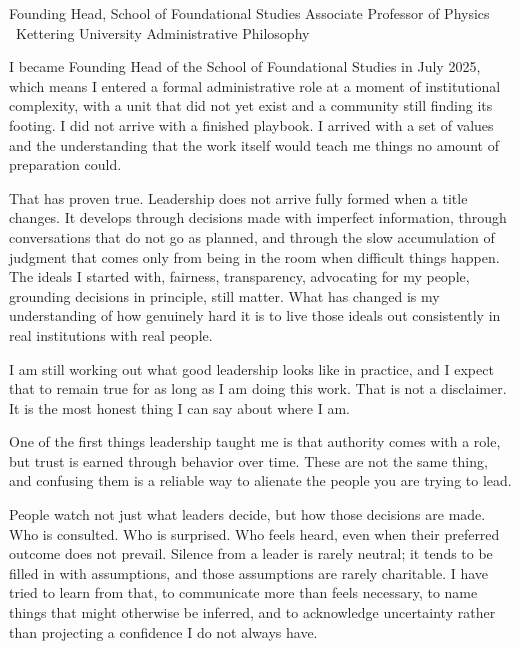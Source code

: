 \documentclass[10pt]{article}
\begin{document}
\statementheader
  {Founding Head, School of Foundational Studies}
  {Associate Professor of Physics \textperiodcentered\ Kettering University}
  {Administrative Philosophy}



I became Founding Head of the School of Foundational Studies in July 2025, which means I
entered a formal administrative role at a moment of institutional complexity, with a unit that
did not yet exist and a community still finding its footing. I did not arrive with a finished
playbook. I arrived with a set of values and the understanding that the work itself would teach
me things no amount of preparation could.

That has proven true. Leadership does not arrive fully formed when a title changes. It
develops through decisions made with imperfect information, through conversations that do not
go as planned, and through the slow accumulation of judgment that comes only from being in the
room when difficult things happen. The ideals I started with, fairness, transparency,
advocating for my people, grounding decisions in principle, still matter. What has changed is
my understanding of how genuinely hard it is to live those ideals out consistently in real
institutions with real people.

I am still working out what good leadership looks like in practice, and I expect that to remain
true for as long as I am doing this work. That is not a disclaimer. It is the most honest thing
I can say about where I am.


One of the first things leadership taught me is that authority comes with a role, but trust is
earned through behavior over time. These are not the same thing, and confusing them is a
reliable way to alienate the people you are trying to lead.

People watch not just what leaders decide, but how those decisions are made. Who is consulted.
Who is surprised. Who feels heard, even when their preferred outcome does not prevail. Silence
from a leader is rarely neutral; it tends to be filled in with assumptions, and those
assumptions are rarely charitable. I have tried to learn from that, to communicate more than
feels necessary, to name things that might otherwise be inferred, and to acknowledge
uncertainty rather than projecting a confidence I do not always have.
\end{document}
